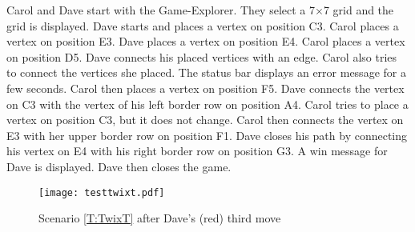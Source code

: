 Carol and Dave start \twixt with the Game-Explorer. They select a 7$\times$7 grid and the grid is displayed. Dave starts and places a vertex on position C3. Carol places a vertex on position E3. Dave places a vertex on position E4. Carol places a vertex on position D5. Dave connects his placed vertices with an edge. Carol also tries to connect the vertices she placed. The status bar displays an error message for a few seconds. Carol then places a vertex on position F5. Dave connects the vertex on C3 with the vertex of his left border row on position A4. Carol tries to place a vertex on position C3, but it does not change. Carol then connects the vertex on E3 with her upper border row on position F1. Dave closes his path by connecting his vertex on E4 with his right border row on position G3. A win message for Dave is displayed. Dave then closes the game.

\begin{figure}[h!]
	\centering
	\texttt{[image: testtwixt.pdf]}
	\caption{Scenario \ref{T:TwixT} after Dave's (red) third move}
	\label{img:ACTDEV}
\end{figure}